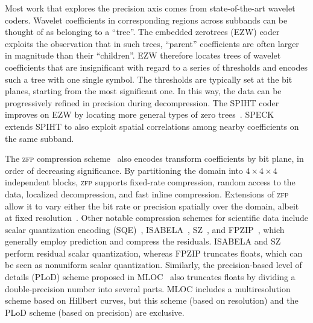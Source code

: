 Most work that explores the precision axis comes from state-of-the-art wavelet coders. Wavelet
coefficients in corresponding regions across subbands can be thought of as belonging to a ``tree''.
The embedded zerotrees (EZW) coder exploits the observation that in such trees, ``parent''
coefficients are often larger in magnitude than their ``children''. EZW therefore locates trees of
wavelet coefficients that are insignificant with regard to a series of thresholds and encodes such a
tree with one single symbol. The thresholds are typically set at the bit planes, starting from the
most significant one. In this way, the data can be progressively refined in precision during
decompression. The SPIHT coder~\cite{spiht1996} improves on EZW by locating more general types of
zero trees~\cite{quantifying-coding-performance}. SPECK~\cite{speck2004} extends SPIHT to also
exploit spatial correlations among nearby coefficients on the same subband.

\newcommand{\zfp}{\textsc{zfp}\xspace}
The \zfp compression scheme~\cite{zfp2014} also encodes transform coefficients by bit plane, in
order of decreasing significance. By partitioning the domain into $4 \times 4 \times 4$ independent
blocks, \zfp supports fixed-rate compression, random access to the data, localized decompression,
and fast inline compression. Extensions of \zfp allow it to vary either the bit rate or precision
spatially over the domain, albeit at fixed resolution~\cite{zfp-arc}. Other notable compression
schemes for scientific data include scalar quantization encoding (SQE)~\cite{sqe},
ISABELA~\cite{isabela}, SZ~\cite{sz}, and FPZIP~\cite{fpzip}, which generally employ prediction and
compress the residuals. ISABELA and SZ perform residual scalar quantization, whereas FPZIP truncates
floats, which can be seen as nonuniform scalar quantization. Similarly, the precision-based level of
details (PLoD) scheme proposed in MLOC~\cite{mloc} also truncates floats by dividing a
double-precision number into several parts. MLOC includes a multiresolution scheme based on Hillbert
curves, but this scheme (based on resolution) and the PLoD scheme (based on precision) are
exclusive.

